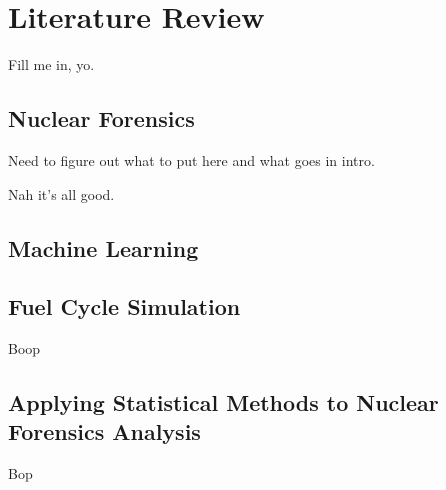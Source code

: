 \chapter{Literature Review}
\label{ch:litrev}

Fill me in, yo.

\section{Nuclear Forensics}
\label{sec:nfoverview}

Need to figure out what to put here and what goes in intro.

Nah it's all good. 

\section{Machine Learning}


\section{Fuel Cycle Simulation}
\label{sec:fcsim}

Boop

\section{Applying Statistical Methods to Nuclear Forensics Analysis}
\label{sec:stats4nf}

Bop
